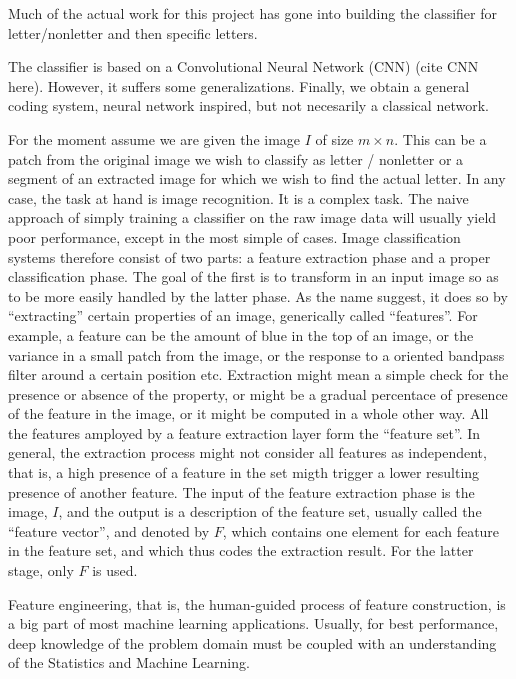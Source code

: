 \documentclass[12pt,a4paper,oneside,english]{UPBThesis}
\newcommand{\hctimes}[2]{{#1}\!\times\!{#2}}
\begin{document}
Much of the actual work for this project has gone into building the classifier for letter/nonletter and then specific letters.

The classifier is based on a Convolutional Neural Network (CNN) (cite CNN here). However, it suffers some generalizations. Finally, we obtain a general coding system, neural network inspired, but not necesarily a classical network.

For the moment assume we are given the image $I$ of size $\hctimes{m}{n}$. This can be a patch from the original image we wish to classify as letter / nonletter or a segment of an extracted image for which we wish to find the actual letter. In any case, the task at hand is image recognition. It is a complex task. The naive approach of simply training a classifier on the raw image data will usually yield poor performance, except in the most simple of cases. Image classification systems therefore consist of two parts: a feature extraction phase and a proper classification phase. The goal of the first is to transform in an input image so as to be more easily handled by the latter phase. As the name suggest, it does so by ``extracting'' certain properties of an image, generically called ``features''. For example, a feature can be the amount of blue in the top of an image, or the variance in a small patch from the image, or the response to a oriented bandpass filter around a certain position etc. Extraction might mean a simple check for the presence or absence of the property, or might be a gradual percentace of presence of the feature in the image, or it might be computed in a whole other way. All the features amployed by a feature extraction layer form the ``feature set''. In general, the extraction process might not consider all features as independent, that is, a high presence of a feature in the set migth trigger a lower resulting presence of another feature. The input of the feature extraction phase is the image, $I$, and the output is a description of the feature set, usually called the ``feature vector'', and denoted by $F$, which contains one element for each feature in the feature set, and which thus codes the extraction result. For the latter stage, only $F$ is used.

Feature engineering, that is, the human-guided process of feature construction, is a big part of most machine learning applications. Usually, for best performance, deep knowledge of the problem domain must be coupled with an understanding of the Statistics and Machine Learning.
\end{document}
